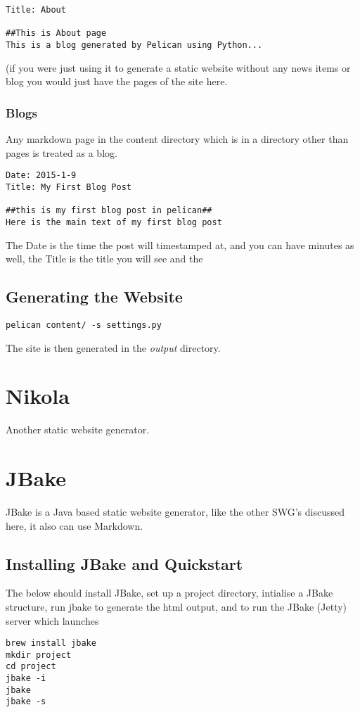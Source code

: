 \documentclass[12pt]{article}			%
\begin{document}
\begin{verbatim}
Title: About

##This is About page
This is a blog generated by Pelican using Python...
\end{verbatim}
(if you were just using it to generate a static website without any news items or blog you would just have the pages of the site here.

\subsubsection{Blogs}
Any markdown page in the content directory which is in a directory other than pages is treated as a blog.

\begin{verbatim}
Date: 2015-1-9
Title: My First Blog Post

##this is my first blog post in pelican##
Here is the main text of my first blog post

\end{verbatim}
The Date is the time the post will timestamped at, and you can have minutes as well, the Title is the title you will see and the
\subsection{Generating the Website}
\begin{verbatim}
pelican content/ -s settings.py
\end{verbatim}
The site is then generated in the \textit{output} directory.


\newpage
\section{Nikola}
Another static website generator.


\newpage
\section{JBake}
JBake is a Java based static website generator, like the other SWG's discussed here, it also can use Markdown.
\subsection{Installing JBake and Quickstart}
The below should install JBake, set up a project directory, intialise a JBake structure, run jbake to generate the html output, and to run the JBake (Jetty) server which launches 
\begin{verbatim}
brew install jbake
mkdir project
cd project
jbake -i
jbake
jbake -s
\end{verbatim}
\end{document}
